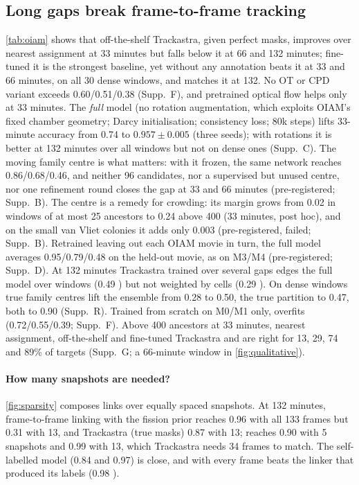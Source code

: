 

\subsection{Long gaps break frame-to-frame tracking}
\cref{tab:oiam} shows that off-the-shelf Trackastra, given perfect masks, improves over nearest assignment at 33 minutes but falls below it at 66 and 132 minutes; fine-tuned it is the strongest baseline, yet \ours without any annotation beats it at 33 and 66 minutes, on all 30 dense windows, and matches it at 132. No OT or CPD variant exceeds 0.60/0.51/0.38 (Supp.~F), and pretrained optical flow helps only at 33 minutes.
The \emph{full} model (no rotation augmentation, which exploits OIAM's fixed chamber geometry; Darcy initialisation; consistency loss; 80k steps) lifts 33-minute accuracy from 0.74 to $0.957{\pm}0.005$ (three seeds); with rotations it is better at 132 minutes over all windows but not on dense ones (Supp.~C).
The moving family centre is what matters: with it frozen, the same network reaches 0.86/0.68/0.46, and neither 96 candidates, nor a supervised but unused centre, nor one refinement round closes the gap at 33 and 66 minutes (pre-registered; Supp.~B). The centre is a remedy for crowding: its margin grows from 0.02 in windows of at most 25 ancestors to 0.24 above 400 (33 minutes, post hoc), and on the small van Vliet colonies it adds only 0.003 (pre-registered, failed; Supp.~B).
Retrained leaving out each OIAM movie in turn, the full model averages 0.95/0.79/0.48 on the held-out movie, as on M3/M4 (pre-registered; Supp.~D).
At 132 minutes Trackastra trained over several gaps edges the full model over windows (0.49 ) but not weighted by cells (0.29 ). On dense windows true family centres lift the ensemble from 0.28 to 0.50, the true partition to 0.47, both to 0.90 (Supp.~R).
Trained from scratch on M0/M1 only, \ours overfits (0.72/0.55/0.39; Supp.~F).
Above 400 ancestors at 33 minutes, nearest assignment, off-the-shelf and fine-tuned Trackastra and \ours are right for 13, 29, 74 and 89\% of targets (Supp.~G; a 66-minute window in \cref{fig:qualitative}).

\paragraph{How many snapshots are needed?}
\cref{fig:sparsity} composes links over equally spaced snapshots.
At 132 minutes, frame-to-frame linking with the fission prior reaches 0.96 with all 133 frames but 0.31 with 13, and Trackastra (true masks) 0.87 with 13; \ours reaches 0.90 with 5 snapshots and 0.99 with 13, which Trackastra needs 34 frames to match.
The self-labelled model (0.84 and 0.97) is close, and with every frame beats the linker that produced its labels (0.98 ).

